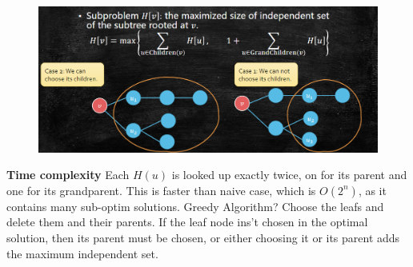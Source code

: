 \begin{figure}
    \centering
    \includegraphics[width=0.5\linewidth]{Notes/fig/maxIndependentSet.png}
\end{figure}
\textbf{Time complexity} Each $H(u)$ is looked up exactly twice, on for its parent and one for its grandparent. This is faster than naive case, which is $O(2^n)$, as it contains many sub-optim solutions.
Greedy Algorithm? Choose the leafs and delete them and their parents.
If the leaf node ins't chosen in the optimal solution, then its parent must be chosen, or either choosing it or its parent adds the maximum independent set.

